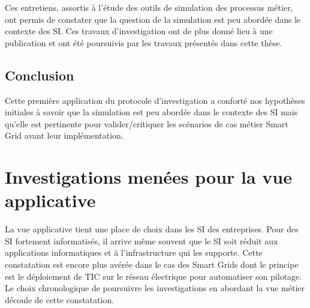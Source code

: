 Ces entretiens, assortis à l'étude des outils de simulation des processus 
métier, ont permis de constater que la question de la simulation est peu abordée 
dans le contexte des SI. Ces travaux d'investigation ont de plus donné lieu à 
une publication \cite{seghiri2012animation} et ont été poursuivis par les 
travaux présentés dans cette thèse.
 
\subsection{Conclusion}
Cette première application du protocole d'investigation a conforté nos hypothèses initiales à savoir que la simulation est peu abordée dans le contexte des SI mais qu'elle est pertinente pour valider/critiquer les scénarios de cas métier Smart Grid avant leur implémentation.

\section{Investigations menées pour la vue applicative} 
\label{sec:investig_appli}
La vue applicative tient une place de choix dans les SI des entreprises. Pour des SI fortement informatisés, il arrive même souvent que le SI soit réduit aux applications informatiques et à l'infrastructure qui les supporte. Cette constatation est encore plus avérée dans le cas des Smart Grids dont le principe est le déploiement de TIC sur le réseau électrique pour automatiser son pilotage. Le choix chronologique de poursuivre les investigations en abordant la vue métier découle de cette constatation.		
			
